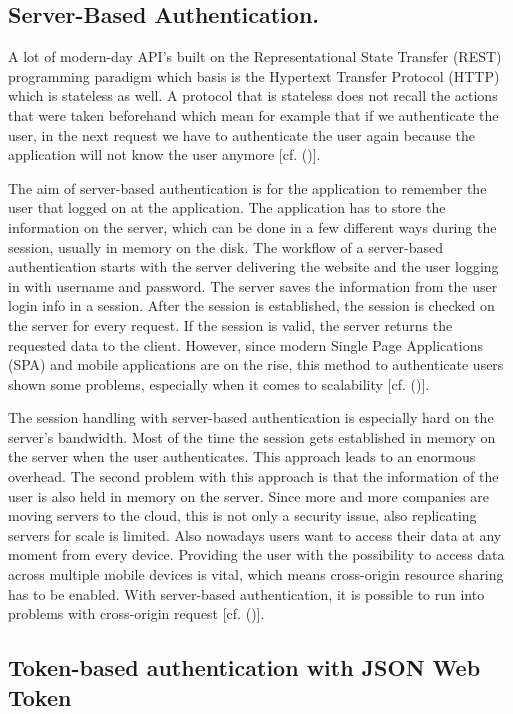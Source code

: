 \subsection{Server-Based Authentication.}
A lot of modern-day API’s built on the Representational State Transfer (REST) programming paradigm which basis is the Hypertext Transfer Protocol (HTTP) which is stateless as well. A protocol that is stateless does not recall the actions that were taken beforehand which mean for example that if we authenticate the user, in the next request we have to authenticate the user again because the application will not know the user anymore [cf. (\cite{Serilleja:2015:Scothio})]. 

The aim of server-based authentication is for the application to remember the user that logged on at the application. The application has to store the information on the server, which can be done in a few different ways during the session, usually in memory on the disk. The workflow of a server-based authentication starts with the server delivering the website and the user logging in with username and password. The server saves the information from the user login info in a session. After the session is established, the session is checked on the server for every request. If the session is valid, the server returns the requested data to the client. However, since modern Single Page Applications (SPA) and mobile applications are on the rise, this method to authenticate users shown some problems, especially when it comes to scalability [cf. (\cite{Serilleja:2015:Scothio})]. 

The session handling with server-based authentication is especially hard on the server’s bandwidth. Most of the time the session gets established in memory on the server when the user authenticates. This approach leads to an enormous overhead. The second problem with this approach is that the information of the user is also held in memory on the server. Since more and more companies are moving servers to the cloud, this is not only a security issue, also replicating servers for scale is limited. Also nowadays users want to access their data at any moment from every device. Providing the user with the possibility to access data across multiple mobile devices is vital, which means cross-origin resource sharing has to be enabled. With server-based authentication, it is possible to run into problems with cross-origin request [cf. (\cite{Serilleja:2015:Scothio})].


\subsection{
	Token-based authentication with JSON Web Token
}

